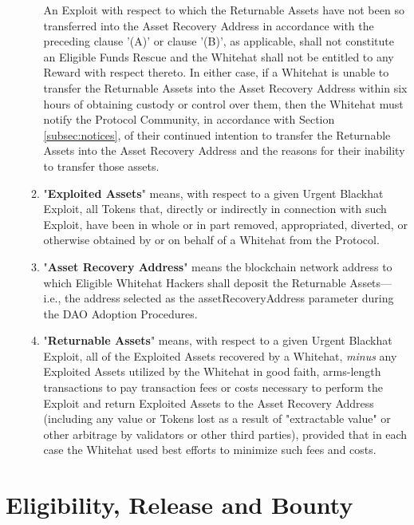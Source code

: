 \documentclass{article}
\begin{document}
\begin{enumerate}[label=\Alph*.]
\begin{enumerate}
                    An Exploit with respect to which the Returnable Assets have not been so transferred into the Asset Recovery Address in accordance with the preceding clause '(A)' or clause '(B)', as applicable, shall not constitute an Eligible Funds Rescue and the Whitehat shall not be entitled to any Reward with respect thereto. In either case, if a Whitehat is unable to transfer the Returnable Assets into the Asset Recovery Address within six hours of obtaining custody or control over them, then the Whitehat must notify the Protocol Community, in accordance with Section \ref{subsec:notices}, of their continued intention to transfer the Returnable Assets into the Asset Recovery Address and the reasons for their inability to transfer those assets.

              \item "\textbf{Exploited Assets}" means, with respect to a given Urgent Blackhat Exploit, all Tokens that, directly or indirectly in connection with such Exploit, have been in whole or in part removed, appropriated, diverted, or otherwise obtained by or on behalf of a Whitehat from the Protocol.

              \item "\textbf{Asset Recovery Address}" means the blockchain network address to which Eligible Whitehat Hackers shall deposit the Returnable Assets—i.e., the address selected as the assetRecoveryAddress parameter during the DAO Adoption Procedures.

              \item "\textbf{Returnable Assets}" means, with respect to a given Urgent Blackhat Exploit, all of the Exploited Assets recovered by a Whitehat, \textit{minus} any Exploited Assets utilized by the Whitehat in good faith, arms-length transactions to pay transaction fees or costs necessary to perform the Exploit and return Exploited Assets to the Asset Recovery Address (including any value or Tokens lost as a result of "extractable value" or other arbitrage by validators or other third parties), provided that in each case the Whitehat used best efforts to minimize such fees and costs.

          \end{enumerate}
\end{enumerate}

\section{Eligibility, Release and Bounty}\label{sec:eligibility}
\end{document}
